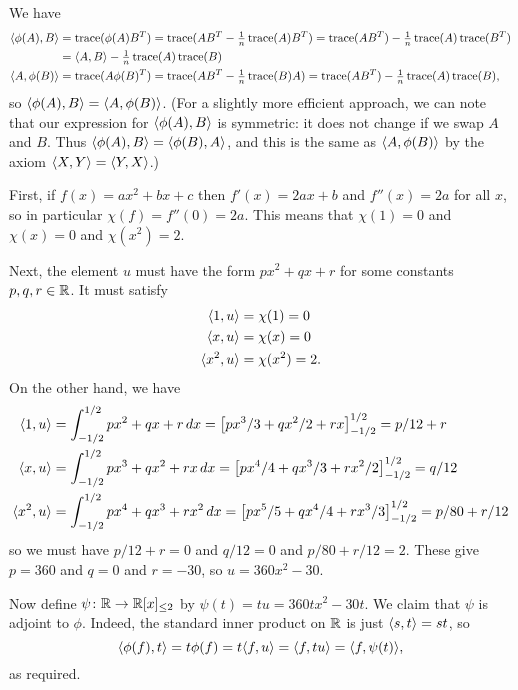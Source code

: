  We have
 \begin{align*}
  \langle \phi(A),B\rangle
   &= \operatorname{trace}(\phi(A)B^T)
    = \operatorname{trace}(AB^T-\tfrac{1}{n}\operatorname{trace}(A)B^T)
    = \operatorname{trace}(AB^T) - \tfrac{1}{n} \operatorname{trace}(A)\operatorname{trace}(B^T) \\
   &= \langle A,B\rangle -  \tfrac{1}{n} \operatorname{trace}(A)\operatorname{trace}(B) \\
  \langle A,\phi(B)\rangle
   &= \operatorname{trace}(A\phi(B)^T)
    = \operatorname{trace}(AB^T - \tfrac{1}{n}\operatorname{trace}(B) A)
    = \operatorname{trace}(AB^T) - \tfrac{1}{n}\operatorname{trace}(A)\operatorname{trace}(B),
 \end{align*}
 so $\langle \phi(A),B\rangle=\langle A,\phi(B)\rangle$.  (For a slightly more
 efficient approach, we can note that our expression for
 $\langle \phi(A),B\rangle$ is symmetric: it does not change if we
 swap $A$ and $B$.  Thus $\langle \phi(A),B\rangle=\langle \phi(B),A\rangle$,
 and this is the same as $\langle A,\phi(B)\rangle$ by the axiom
 $\langle X,Y\rangle=\langle Y,X\rangle$.)
\EndDeferredSolution

 First, if $f(x)=ax^2+bx+c$ then $f'(x)=2ax+b$ and
 $f''(x)=2a$ for all $x$, so in particular
 $\chi(f)=f''(0)=2a$.  This means that $\chi(1)=0$ and
 $\chi(x)=0$ and $\chi(x^2)=2$.

 Next, the element $u$ must have the form $px^2+qx+r$ for some
 constants $p,q,r\in{\mathbb{R}}$.  It must satisfy
 \begin{align*}
  \langle 1,u\rangle &= \chi(1) = 0 \\
  \langle x,u\rangle &= \chi(x) = 0 \\
  \langle x^2,u\rangle &= \chi(x^2) = 2.
 \end{align*}
 On the other hand, we have
 \begin{align*}
  \langle 1,u\rangle
   &= \int_{-1/2}^{1/2} px^2+qx+r\,dx
    = \left[ px^3/3 + qx^2/2 + rx \right]_{-1/2}^{1/2}
    = p/12 + r \\
  \langle x,u\rangle
   &= \int_{-1/2}^{1/2} px^3+qx^2+rx\,dx
    = \left[ px^4/4 + qx^3/3 + rx^2/2 \right]_{-1/2}^{1/2}
    = q/12 \\
  \langle x^2,u\rangle
   &= \int_{-1/2}^{1/2} px^4+qx^3+rx^2\,dx
    = \left[ px^5/5 + qx^4/4 + rx^3/3 \right]_{-1/2}^{1/2}
    = p/80 + r/12
 \end{align*}
 so we must have
 $p/12+r=0$ and $q/12=0$ and $p/80+r/12=2$.  These give
 $p=360$ and $q=0$ and $r=-30$, so $u=360x^2-30$.

 Now define $\psi\colon{\mathbb{R}}\to{\mathbb{R}}[x]_{\leq 2}$ by $\psi(t)=tu=360
 tx^2-30t$.  We claim that $\psi$ is adjoint to $\phi$.
 Indeed, the standard inner product on ${\mathbb{R}}$ is just
 $\langle s,t\rangle=st$, so
 \[ \langle \phi(f),t\rangle = t\phi(f)=t\langle f,u\rangle=\langle f,tu\rangle=\langle f,\psi(t)\rangle,
 \]
 as required.
\EndDeferredSolution

